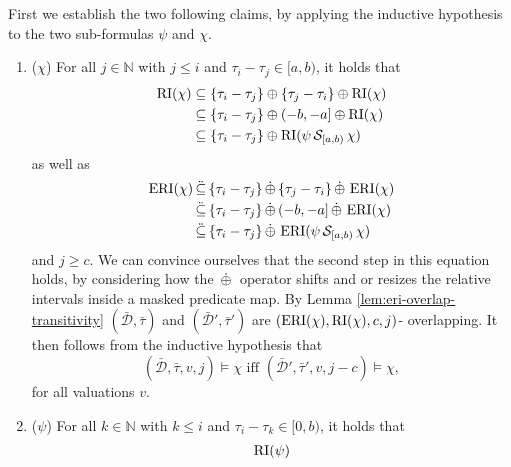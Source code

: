 \begin{itemize}
        First we establish the two following claims, by applying the inductive hypothesis to the two sub-formulas $\psi$ and $\chi$.
        \begin{enumerate}
            \item ($\chi$)
                For all $j \in \mathbb{N}$ with $j \leq i$ and $\tau_i - \tau_j \in [a,b)$, it holds that 
                \begin{align*}
                    \operatorname{RI}(\chi) 
                    &\subseteq \{ \tau_i - \tau_j \} \oplus \{ \tau_j - \tau_i\} \oplus \operatorname{RI}(\chi) \\
                    &\subseteq \{\tau_i - \tau_j \} \oplus (-b, -a] \oplus \operatorname{RI}(\chi) \\
                    &\subseteq \{ \tau_i - \tau_j \} \oplus \operatorname{RI}(\psi \,\mathcal{S}_{[a,b)}\, \chi)
                \end{align*}
                as well as
                \begin{align*}
                    \operatorname{ERI}(\chi) 
                    &\,\ddot{\subseteq}\, \{ \tau_i - \tau_j \} \,\dot{\oplus}\, \{ \tau_j - \tau_i\} \,\dot{\oplus}\, \operatorname{ERI}(\chi) \\
                    &\,\ddot{\subseteq}\, \{\tau_i - \tau_j \} \,\dot{\oplus}\, (-b, -a] \,\dot{\oplus}\, \operatorname{ERI}(\chi) \\
                    &\,\ddot{\subseteq}\, \{ \tau_i - \tau_j \} \,\dot{\oplus}\, \operatorname{ERI}(\psi \,\mathcal{S}_{[a,b)}\, \chi)
                \end{align*}
                and $j \geq c$.
                We can convince ourselves that the second step in this equation holds, by considering how the $\,\dot{\oplus}\,$ operator shifts and or resizes the relative intervals inside a masked predicate map.
                By Lemma \ref{lem:eri-overlap-transitivity} $(\bar{\mathcal{D}}, \bar{\tau})$ and $(\bar{\mathcal{D}}', \bar{\tau}')$ are $(\operatorname{ERI}(\chi), \operatorname{RI}(\chi), c, j)$- overlapping.
                It then follows from the inductive hypothesis that
                \begin{equation*}
                    (\bar{\mathcal{D}}, \bar{\tau}, v, j) \models \chi
                    \text{ iff }
                    (\bar{\mathcal{D}}', \bar{\tau}', v, j-c) \models \chi,
                \end{equation*}
                for all valuations $v$.
            \item ($\psi$)
                For all $k \in \mathbb{N}$ with $k \leq i$ and $\tau_i - \tau_k \in [0,b)$, it holds that
                \begin{align*}
                    \RI(\psi)

\end{align*}
\end{enumerate}
\end{itemize}
